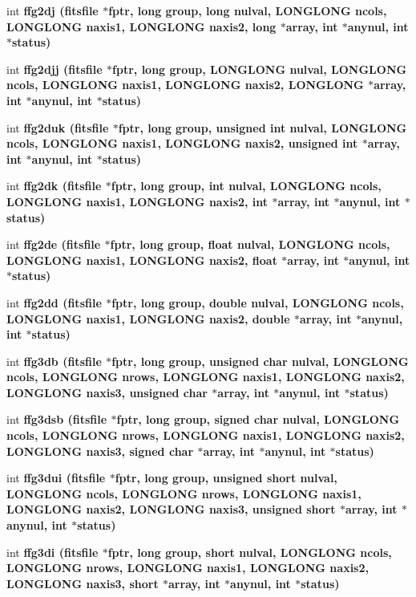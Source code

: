 \begin{CompactItemize}
\item 
int \bf{ffg2dj} (\bf{fitsfile} $\ast$fptr, long group, long nulval, \bf{LONGLONG} ncols, \bf{LONGLONG} naxis1, \bf{LONGLONG} naxis2, long $\ast$array, int $\ast$anynul, int $\ast$status)
\item 
int \bf{ffg2djj} (\bf{fitsfile} $\ast$fptr, long group, \bf{LONGLONG} nulval, \bf{LONGLONG} ncols, \bf{LONGLONG} naxis1, \bf{LONGLONG} naxis2, \bf{LONGLONG} $\ast$array, int $\ast$anynul, int $\ast$status)
\item 
int \bf{ffg2duk} (\bf{fitsfile} $\ast$fptr, long group, unsigned int nulval, \bf{LONGLONG} ncols, \bf{LONGLONG} naxis1, \bf{LONGLONG} naxis2, unsigned int $\ast$array, int $\ast$anynul, int $\ast$status)
\item 
int \bf{ffg2dk} (\bf{fitsfile} $\ast$fptr, long group, int nulval, \bf{LONGLONG} ncols, \bf{LONGLONG} naxis1, \bf{LONGLONG} naxis2, int $\ast$array, int $\ast$anynul, int $\ast$status)
\item 
int \bf{ffg2de} (\bf{fitsfile} $\ast$fptr, long group, float nulval, \bf{LONGLONG} ncols, \bf{LONGLONG} naxis1, \bf{LONGLONG} naxis2, float $\ast$array, int $\ast$anynul, int $\ast$status)
\item 
int \bf{ffg2dd} (\bf{fitsfile} $\ast$fptr, long group, double nulval, \bf{LONGLONG} ncols, \bf{LONGLONG} naxis1, \bf{LONGLONG} naxis2, double $\ast$array, int $\ast$anynul, int $\ast$status)
\item 
int \bf{ffg3db} (\bf{fitsfile} $\ast$fptr, long group, unsigned char nulval, \bf{LONGLONG} ncols, \bf{LONGLONG} nrows, \bf{LONGLONG} naxis1, \bf{LONGLONG} naxis2, \bf{LONGLONG} naxis3, unsigned char $\ast$array, int $\ast$anynul, int $\ast$status)
\item 
int \bf{ffg3dsb} (\bf{fitsfile} $\ast$fptr, long group, signed char nulval, \bf{LONGLONG} ncols, \bf{LONGLONG} nrows, \bf{LONGLONG} naxis1, \bf{LONGLONG} naxis2, \bf{LONGLONG} naxis3, signed char $\ast$array, int $\ast$anynul, int $\ast$status)
\item 
int \bf{ffg3dui} (\bf{fitsfile} $\ast$fptr, long group, unsigned short nulval, \bf{LONGLONG} ncols, \bf{LONGLONG} nrows, \bf{LONGLONG} naxis1, \bf{LONGLONG} naxis2, \bf{LONGLONG} naxis3, unsigned short $\ast$array, int $\ast$anynul, int $\ast$status)
\item 
int \bf{ffg3di} (\bf{fitsfile} $\ast$fptr, long group, short nulval, \bf{LONGLONG} ncols, \bf{LONGLONG} nrows, \bf{LONGLONG} naxis1, \bf{LONGLONG} naxis2, \bf{LONGLONG} naxis3, short $\ast$array, int $\ast$anynul, int $\ast$status)

\end{CompactItemize}
